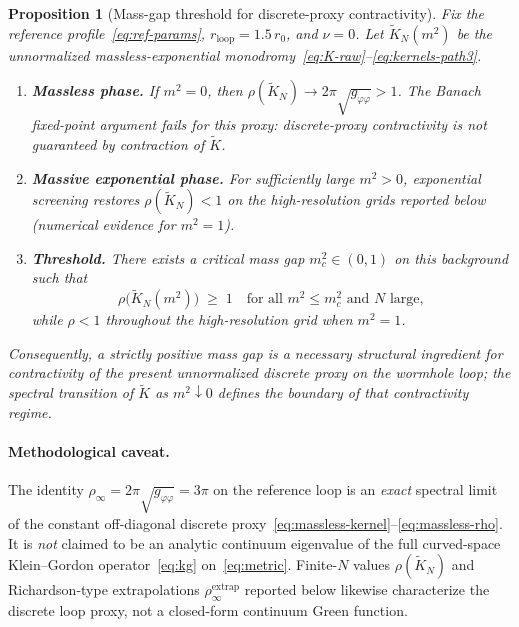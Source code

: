 \documentclass{iopjournal}
\newtheorem{proposition}[theorem]{Proposition}
\theoremstyle{remark}
\begin{document}
\begin{proposition}[Mass-gap threshold for discrete-proxy contractivity]
\label{prop:mass-gap}
Fix the reference profile~\eqref{eq:ref-params}, $r_{\mathrm{loop}}=1.5\,r_{0}$, and $\nu=0$.
Let $\widetilde{K}_{N}(m^{2})$ be the unnormalized massless-exponential monodromy~\eqref{eq:K-raw}--\eqref{eq:kernels-path3}.
\begin{enumerate}
  \item[(i)] \textbf{Massless phase.}
    If $m^{2}=0$, then $\rho(\widetilde{K}_{N})\to 2\pi\sqrt{g_{\varphi\varphi}}>1$.
    The Banach fixed-point argument fails for this proxy: discrete-proxy contractivity is \emph{not} guaranteed by contraction of $\widetilde{K}$.
  \item[(ii)] \textbf{Massive exponential phase.}
    For sufficiently large $m^{2}>0$, exponential screening restores $\rho(\widetilde{K}_{N})<1$ on the high-resolution grids reported below (numerical evidence for $m^{2}=1$).
  \item[(iii)] \textbf{Threshold.}
    There exists a critical mass gap $m_{c}^{2}\in(0,1)$ on this background such that
    \[
    \rho\bigl(\widetilde{K}_{N}(m^{2})\bigr)
    \;\ge\; 1
    \quad\text{for all }m^{2}\le m_{c}^{2}
    \text{ and }N\text{ large},
    \]
    while $\rho<1$ throughout the high-resolution grid when $m^{2}=1$.
\end{enumerate}
Consequently, a strictly positive mass gap is a \emph{necessary} structural ingredient for contractivity of the present unnormalized discrete proxy on the wormhole loop; the spectral transition of $\widetilde{K}$ as $m^{2}\downarrow 0$ defines the boundary of that contractivity regime.
\end{proposition}

\paragraph{Methodological caveat.}
The identity $\rho_{\infty}=2\pi\sqrt{g_{\varphi\varphi}}=3\pi$ on the reference loop is an \emph{exact} spectral limit of the constant off-diagonal discrete proxy~\eqref{eq:massless-kernel}--\eqref{eq:massless-rho}.
It is \emph{not} claimed to be an analytic continuum eigenvalue of the full curved-space Klein--Gordon operator~\eqref{eq:kg} on~\eqref{eq:metric}.
Finite-$N$ values $\rho(\widetilde{K}_{N})$ and Richardson-type extrapolations $\rho_{\infty}^{\mathrm{extrap}}$ reported below likewise characterize the discrete loop proxy, not a closed-form continuum Green function.
\end{document}
